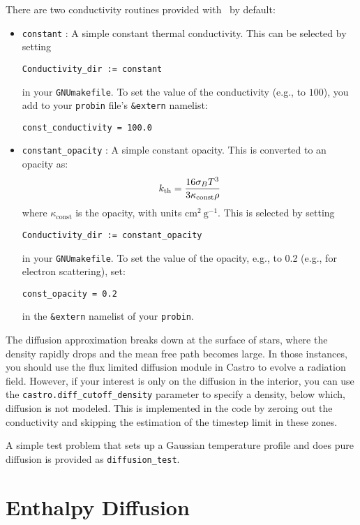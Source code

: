 There are two conductivity routines provided with \castro\ by default:
\begin{itemize}
\item {\tt constant} : A simple constant thermal conductivity.  This can be 
  selected by setting 
\begin{verbatim}
Conductivity_dir := constant
\end{verbatim}
in your {\tt GNUmakefile}.  To set the value of the conductivity (e.g., to
$100$), you add to your {\tt probin} file's {\tt \&extern} namelist:
\begin{verbatim}
const_conductivity = 100.0
\end{verbatim}

\item {\tt constant\_opacity} : A simple constant opacity.  This is
  converted to an opacity as:
  \begin{equation}
    {k_\mathrm{th}} = \frac{16 \sigma_B T^3}{3 \kappa_\mathrm{const} \rho}
  \end{equation}
where $\kappa_\mathrm{const}$ is the opacity, with units $\mathrm{cm^2~g^{-1}}$.
This is selected by setting
\begin{verbatim}
Conductivity_dir := constant_opacity
\end{verbatim}
in your {\tt GNUmakefile}.  To set the value of the opacity, e.g., to
0.2 (e.g., for electron scattering), set:
\begin{verbatim}
const_opacity = 0.2
\end{verbatim}
in the {\tt \&extern} namelist of your {\tt probin}.

\end{itemize}

The diffusion approximation breaks down at the surface of stars,
where the density rapidly drops and the mean free path becomes 
large.  In those instances, you should use the flux limited diffusion
module in Castro to evolve a radiation field.  However, if your
interest is only on the diffusion in the interior, you can use
the {\tt castro.diff\_cutoff\_density} parameter to specify a density,
below which, diffusion is not modeled.  This is implemented in the
code by zeroing out the conductivity and skipping the estimation
of the timestep limit in these zones.

A simple test problem that sets up a Gaussian temperature profile 
and does pure diffusion is provided as {\tt diffusion\_test}.



\section{Enthalpy Diffusion}

